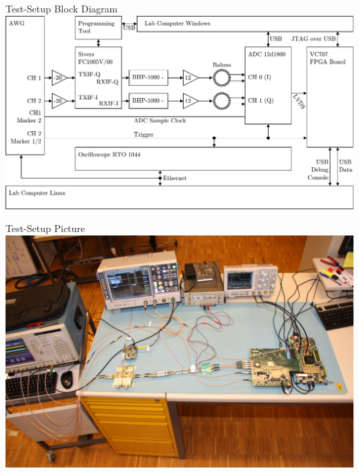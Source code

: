 \documentclass[10pt]{beamer}
\begin{document}
\begin{frame}{Test-Setup Block Diagram}
  \includegraphics[width=\textwidth]{figures/res_450_setup}
\end{frame}

\begin{frame}{Test-Setup Picture}
  \includegraphics[width=\textwidth]{pictures/res_450_setup}
\end{frame}
\end{document}
